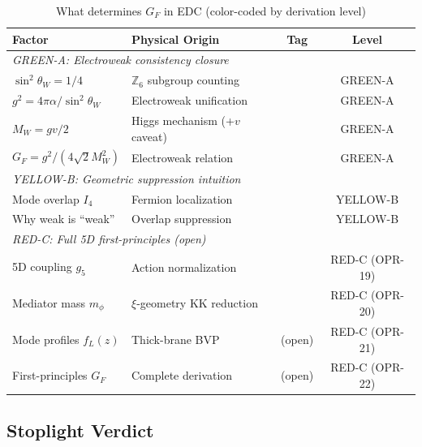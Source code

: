 \begin{table}[ht]
\centering
\caption{What determines $G_F$ in EDC (color-coded by derivation level)}
\label{tab:ch11_summary}
\begin{tabular}{p{3.5cm}p{4.5cm}cc}
\toprule
\textbf{Factor} & \textbf{Physical Origin} & \textbf{Tag} & \textbf{Level} \\
\midrule
\multicolumn{4}{l}{\textit{GREEN-A: Electroweak consistency closure}} \\
$\sin^2\theta_W = 1/4$ & $\mathbb{Z}_6$ subgroup counting & \tagDer{} & GREEN-A \\
$g^2 = 4\pi\alpha/\sin^2\theta_W$ & Electroweak unification & \tagDc{} & GREEN-A \\
$M_W = gv/2$ & Higgs mechanism (+$v$ caveat) & \tagDc{} & GREEN-A \\
$G_F = g^2/(4\sqrt{2}M_W^2)$ & Electroweak relation & \tagDc{} & GREEN-A \\
\midrule
\multicolumn{4}{l}{\textit{YELLOW-B: Geometric suppression intuition}} \\
Mode overlap $I_4$ & Fermion localization & \tagP{} & YELLOW-B \\
Why weak is ``weak'' & Overlap suppression & \tagI{} & YELLOW-B \\
\midrule
\multicolumn{4}{l}{\textit{RED-C: Full 5D first-principles (open)}} \\
5D coupling $g_5$ & Action normalization & \tagP{} & RED-C (OPR-19) \\
Mediator mass $m_\phi$ & $\xi$-geometry KK reduction & \tagP{} & RED-C (OPR-20) \\
Mode profiles $f_L(z)$ & Thick-brane BVP & (open) & RED-C (OPR-21) \\
First-principles $G_F$ & Complete derivation & (open) & RED-C (OPR-22) \\
\bottomrule
\end{tabular}
\end{table}

\subsection{Stoplight Verdict}
\label{sec:ch11_verdict}

